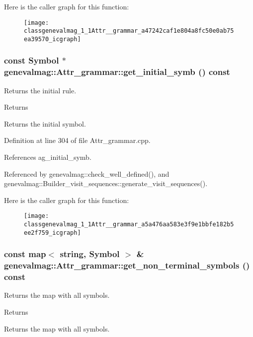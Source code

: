 Here is the caller graph for this function:\nopagebreak
\begin{figure}[H]
\begin{center}
\leavevmode
\texttt{[image: classgenevalmag\_1\_1Attr\_\_grammar\_a47242caf1e804a8fc50e0ab75ea39570\_icgraph]}
\end{center}
\end{figure}


\hypertarget{classgenevalmag_1_1Attr__grammar_a5a476aa583e3f9e1bbfe182b5ee2f759}{
\subsubsection[{get\_\-initial\_\-symb}]{\setlength{\rightskip}{0pt plus 5cm}const {\bf Symbol} $\ast$ genevalmag::Attr\_\-grammar::get\_\-initial\_\-symb () const}}
\label{classgenevalmag_1_1Attr__grammar_a5a476aa583e3f9e1bbfe182b5ee2f759}
Returns the initial rule. \begin{DoxyReturn}{Returns}

\end{DoxyReturn}
Returns the initial symbol. 

Definition at line 304 of file Attr\_\-grammar.cpp.



References ag\_\-initial\_\-symb.



Referenced by genevalmag::check\_\-well\_\-defined(), and genevalmag::Builder\_\-visit\_\-sequences::generate\_\-visit\_\-sequences().



Here is the caller graph for this function:\nopagebreak
\begin{figure}[H]
\begin{center}
\leavevmode
\texttt{[image: classgenevalmag\_1\_1Attr\_\_grammar\_a5a476aa583e3f9e1bbfe182b5ee2f759\_icgraph]}
\end{center}
\end{figure}


\hypertarget{classgenevalmag_1_1Attr__grammar_a50a326649bbf48d2d715144cef59a75e}{
\subsubsection[{get\_\-non\_\-terminal\_\-symbols}]{\setlength{\rightskip}{0pt plus 5cm}const map$<$ string, {\bf Symbol} $>$ \& genevalmag::Attr\_\-grammar::get\_\-non\_\-terminal\_\-symbols () const}}
\label{classgenevalmag_1_1Attr__grammar_a50a326649bbf48d2d715144cef59a75e}
Returns the map with all symbols. \begin{DoxyReturn}{Returns}

\end{DoxyReturn}
Returns the map with all symbols. 

